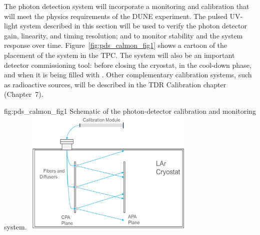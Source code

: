 

The photon detection system will incorporate a monitoring and calibration that will meet the physics requirements of the DUNE experiment. The pulsed UV-light system described in this section will be used to verify the photon detector gain, linearity, and timing resolution; and to monitor stability and the system response over time.  Figure~\ref{fig:pds_calmon_fig1} shows a cartoon of the placement of the system in the TPC. The system will also be an important detector commissioning tool: before closing the cryostat, 
in the cool-down phase, and when it is being filled with \lar.
Other complementary calibration systems, such as radioactive sources, will be described in the TDR Calibration chapter (Chapter~7). 


\begin{dunefigure}
 {fig:pds_calmon_fig1}
 {Schematic of the  photon-detector calibration and monitoring system.}
\includegraphics[angle=0,width=8.4cm,height=6cm]{graphics/pds-calmon-fig1-old.png}
\end{dunefigure}

